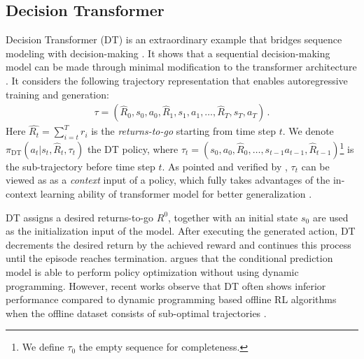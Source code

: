 \subsection{Decision Transformer}

Decision Transformer (DT) is an extraordinary example that bridges sequence modeling with decision-making \citep{chen2021decision}. 
It shows that a sequential decision-making model can be made through minimal modification to the transformer architecture \citep{vaswani2017attention,radford2019language}. 
It considers the following trajectory representation that enables autoregressive training and generation: 
\begin{align}
\tau = \left( \widehat{R}_0, s_0, a_0, \widehat{R}_1, s_1, a_1, \dots, \widehat{R}_T, s_T, a_T\right)\, .
\label{eq:dt-traj}
\end{align}
Here $\widehat{R_t} = \sum_{i=t}^{T}  r_i$ is the \emph{returns-to-go} starting from time step $t$. 
We denote $\pi_{ \mathrm{DT}}(a_t|s_t, \widehat{R}_t, \tau_t)$ the DT policy, where $\tau_{t}=(s_0, a_0, \widehat{R}_0, \dots, s_{t-1} a_{t-1}, \widehat{R}_{t-1})$\footnote{We define $\tau_0$ the empty sequence for completeness. } is the sub-trajectory before time step $t$.  
As pointed and verified by \citet{lee2023supervised}, 
$\tau_t$ can be viewed as as a \emph{context} input of a policy, which fully takes advantages of the in-context learning ability of transformer model for better generalization \citep{akyurek2022learning,garg2022can,laskin2022context}.   

DT  assigns a desired returns-to-go ${R}^0$, together with an initial state $s_0$ are used as the initialization input of the model. After executing the generated action,  DT decrements the desired return by the achieved reward and continues this process until the episode reaches termination. 
\citet{chen2021decision} argues that the conditional prediction model is able to perform policy optimization without using dynamic programming. 
However, recent works observe that
DT often shows inferior performance compared to dynamic programming based offline RL algorithms when the offline dataset consists of sub-optimal trajectories \citep{fujimoto2021minimalist,emmons2021rvs,kostrikov2022offline}. 



